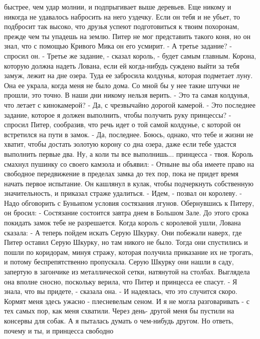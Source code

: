быстрее, чем удар молнии, и подпрыгивает выше деревьев. Еще никому и 
никогда не удавалось набросить на него уздечку. Если он тебя и не 
убьет, то подбросит так высоко, что друзья успеют подготовиться к 
твоим похоронам, прежде чем ты упадешь на землю.
    Питер не мог представить такого коня, но он знал, что с помощью 
Кривого Мика он его усмирит.
    - А третье задание? - спросил он.
    - Третье же задание, - сказал король, - будет самым главным. 
Корона, которую должна надеть Лована, если ей когда-нибудь суждено 
выйти за тебя замуж, лежит на дне озера. Туда ее забросила колдунья, 
которая подметает луну. Она ее украла, когда меня не было дома. Со 
мной бы у нее такие штучки не прошли, это точно. В наши дни никому 
нельзя верить.
    - Это та самая колдунья, что летает с кинокамерой?
    - Да, с чрезвычайно дорогой камерой.
    - Это последнее задание, которое я должен выполнить, чтобы 
получить руку принцессы? - спросил Питер, сообразив, что речь идет о 
той самой колдунье, с которой он встретился на пути в замок.
    - Да, последнее. Боюсь, однако, что тебе и жизни не хватит, чтобы 
достать золотую корону со дна озера, даже если тебе удастся выполнить 
первые два. Ну, а коли ты все выполнишь... принцесса - твоя.
    Король смахнул пушинку со своего камзола и объявил:
    - Отныне вы оба имеете право на свободное передвижение в пределах 
замка до тех пор, пока не придет время начать первое испытание.
    Он кашлянул в кулак, чтобы подчеркнуть собственную значительность, 
и приказал страже удалиться.
    - Идем, - позвал он королеву. - Надо обговорить с Буньипом условия 
состязания лгунов.
    Обернувшись к Питеру, он бросил:
    - Состязание состоится завтра днем в Большом Зале. До этого срока 
покидать замок тебе не разрешается.
    Когда король с королевой ушли, Лована сказала:
    - А теперь пойдем искать Серую Шкурку.
    Они побежали наверх, где Питер оставил Серую Шкурку, но там никого 
не было. Тогда они спустились и пошли по коридорам, минуя стражу, 
которая получила приказание их не трогать, и потому беспрепятственно 
пропускала. Серую Шкурку они нашли в саду, запертую в загончике из 
металлической сетки, натянутой на столбах. Выглядела она вполне 
сносно, поскольку верила, что Питер и принцесса ее спасут.
    - Я знала, что вы придете, - сказала она. - И надеялась, что это 
случится скоро. Кормят меня здесь ужасно - плесневелым сеном. И я не 
могла разговаривать - с тех самых пор, как меня схватили. Через день-
другой меня бы пустили на консервы для собак. А я пыталась думать о 
чем-нибудь другом. Но ответь, почему и ты, и принцесса свободно 
